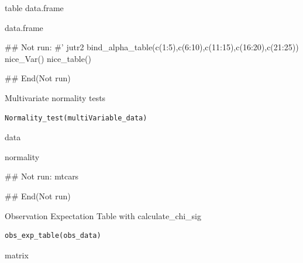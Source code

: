 \documentclass[a4paper]{book}
\begin{document}
%
\begin{Value}
table data.frame

data.frame
\end{Value}
%
\begin{Examples}
\begin{ExampleCode}

## Not run: 
#'
jutr2 %
  bind_alpha_table(c(1:5),c(6:10),c(11:15),c(16:20),c(21:25))%
  nice_Var()%
  nice_table()

## End(Not run)
\end{ExampleCode}
\end{Examples}
%
\begin{Description}
Multivariate normality tests
\end{Description}
%
\begin{Usage}
\begin{verbatim}
Normality_test(multiVariable_data)
\end{verbatim}
\end{Usage}
%
\begin{Arguments}
\begin{ldescription}
\item[\code{multiVariable\_data}] data
\end{ldescription}
\end{Arguments}
%
\begin{Value}
normality
\end{Value}
%
\begin{Examples}
\begin{ExampleCode}

## Not run: 
mtcars%

## End(Not run)

\end{ExampleCode}
\end{Examples}
%
\begin{Description}
Observation Expectation Table with calculate\_chi\_sig
\end{Description}
%
\begin{Usage}
\begin{verbatim}
obs_exp_table(obs_data)
\end{verbatim}
\end{Usage}
%
\begin{Arguments}
\begin{ldescription}
\item[\code{obs\_data}] matrix
\end{ldescription}
\end{Arguments}
\end{document}
